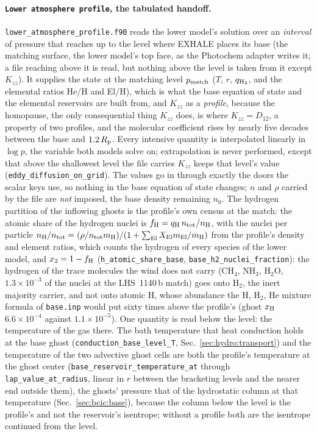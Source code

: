 \paragraph{\texttt{Lower atmosphere profile}, the tabulated handoff.}
\texttt{lower\_atmosphere\_profile.f90} reads the lower model's solution
over an \emph{interval} of pressure that reaches up to the level where
EXHALE places its base (the matching surface, the lower model's top face, as
the Photochem adapter writes it; a file reaching above it is read, but
nothing above the level is taken from it except $K_{zz}$). It supplies the state at the matching level
$p_{\rm match}$ ($T$, $r$, $q_{\rm H_2}$, and the elemental ratios He/H and
El/H), which is what the base equation of state and the elemental reservoirs
are built from, and $K_{zz}$ as a \emph{profile}, because the homopause,
the only consequential thing $K_{zz}$ does, is where $K_{zz}=D_{12}$, a
property of two profiles, and the molecular coefficient rises by nearly five
decades between the base and $1.2\,R_{\rm p}$. Every intensive quantity is
interpolated linearly in $\log p$, the variable both models solve on;
extrapolation is never performed, except that above the shallowest level the
file carries $K_{zz}$ keeps that level's value (\texttt{eddy\_diffusion\_on\_grid}).
The values go in through exactly the doors
the scalar keys use, so nothing in the base equation of state changes; $n$
and $\rho$ carried by the file are \emph{not} imposed, the base density
remaining $n_0$. The hydrogen partition of the inflowing ghosts is the
profile's own census at the match: the atomic share of the hydrogen nuclei
is $f_{\rm H} = q_{\rm H}\,n_{\rm tot}/n_{\rm H}$, with the nuclei per
particle $n_{\rm H}/n_{\rm tot} = (\rho/n_{\rm tot}m_{\rm H})/(1+\sum_{\rm El}
X_{\rm El}m_{\rm El}/m_{\rm H})$ from the profile's density and element
ratios, which counts the hydrogen of every species of the lower model, and
$x_2 = 1-f_{\rm H}$ (\texttt{h\_atomic\_share\_base},
\texttt{base\_h2\_nuclei\_fraction}): the hydrogen of the trace molecules
the wind does not carry (CH$_4$, NH$_3$, H$_2$O, $1.3\times10^{-3}$ of the
nuclei at the LHS~1140\,b match) goes onto H$_2$, the inert majority
carrier, and not onto atomic H, whose abundance the H, H$_2$, He mixture
formula of \texttt{base.inp} would put sixty times above the profile's
(ghost $x_{\rm H}$ $6.6\times10^{-4}$ against $1.1\times10^{-5}$). One
quantity is read below the level: the temperature of the gas there. The bath
temperature that heat conduction holds at the base ghost
(\texttt{conduction\_base\_level\_T}, Sec.~\ref{sec:hydro:transport}) and
the temperature of the two advective ghost cells are both the profile's
temperature at the ghost center (\texttt{base\_reservoir\_temperature\_at}
through \texttt{lap\_value\_at\_radius}, linear in $r$ between the
bracketing levels and the nearer end outside them), the ghosts' pressure that
of the hydrostatic column at that temperature
(Sec.~\ref{sec:bcic:base}), because the column below the level is the
profile's and not the reservoir's isentrope; without a profile both are the
isentrope continued from the level.

